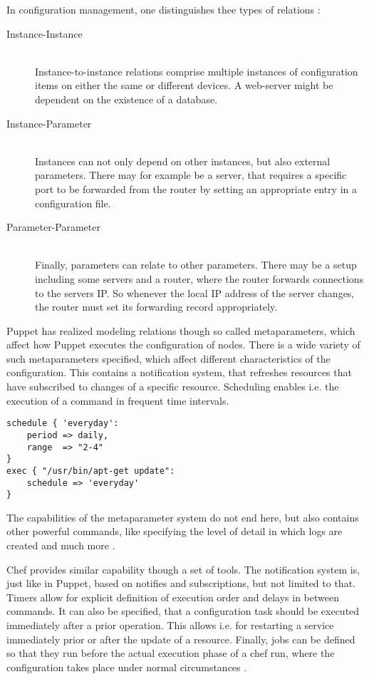 In configuration management, one distinguishes thee types of relations \cite{delaet2010survey}:
\begin{description}
\item[Instance-Instance] \hfill \\ 
Instance-to-instance relations comprise multiple instances of configuration items on either the same or different devices. A web-server might be dependent on the existence of a database.
\item[Instance-Parameter] \hfill \\ 
Instances can not only depend on other instances, but also external parameters. There may for example be a server, that requires a specific port to be forwarded from the router by setting an appropriate entry in a configuration file.
\item[Parameter-Parameter] \hfill \\ 
Finally, parameters can relate to other parameters. There may be a setup including some servers and a router, where the router forwards connections to the servers IP. So whenever the local IP address of the server changes, the router must set its forwarding record appropriately.
\end{description}

Puppet has realized modeling relations though so called metaparameters, which affect how Puppet executes the configuration of nodes. There is a wide variety of such metaparameters specified, which affect different characteristics of the configuration. This contains a notification system, that refreshes resources that have subscribed to changes of a specific resource. Scheduling enables i.e. the execution of a command in frequent time intervals.

\begin{verbatim}
schedule { 'everyday':
	period => daily,
	range  => "2-4"
}
exec { "/usr/bin/apt-get update":
	schedule => 'everyday'
}
\end{verbatim}

The capabilities of the metaparameter system do not end here, but also contains other powerful commands, like specifying the level of detail in which logs are created and much more  \cite{puppetcommetaparameter}.

Chef provides similar capability though a set of tools. The notification system is, just like in Puppet, based on notifies and subscriptions, but not limited to that. Timers allow for explicit definition of execution order and delays in between commands. It can also be specified, that a configuration task should be executed immediately after a prior operation. This allows i.e. for restarting a service immediately prior or after the update of a resource. Finally, jobs can be defined so that they run before the actual execution phase of a chef run, where the configuration takes place under normal circumstances \cite{chefiocommonfunc}.